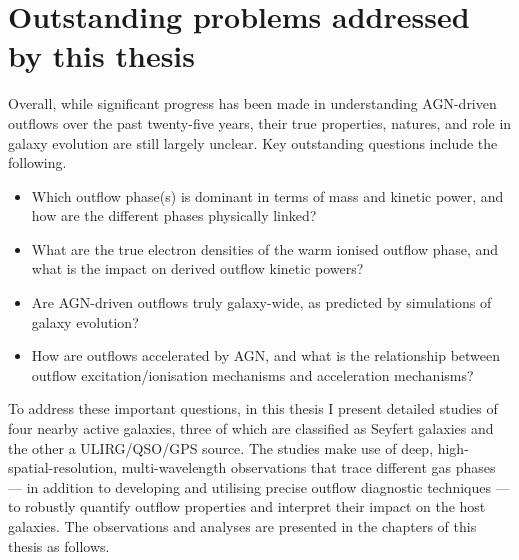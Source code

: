 \newpage

\section{Outstanding problems addressed by this thesis}
\label{section: introduction: outstanding problems}

Overall, while significant progress has been made in understanding AGN-driven outflows over the past twenty-five years, their true properties, natures, and role in galaxy evolution are still largely unclear. Key outstanding questions include the following. \\

\begin{itemize}
    \item Which outflow phase(s) is dominant in terms of mass and kinetic power, and how are the different phases physically linked?
    \item What are the true electron densities of the warm ionised outflow phase, and what is the impact on derived outflow kinetic powers?
    \item Are AGN-driven outflows truly galaxy-wide, as predicted by simulations of galaxy evolution?
    \item How are outflows accelerated by AGN, and what is the relationship between outflow excitation/ionisation mechanisms and acceleration mechanisms? \\
\end{itemize}

To address these important questions, in this thesis I present detailed studies of four nearby active galaxies, three of which are classified as Seyfert galaxies and the other a ULIRG/QSO/GPS source. The studies make use of deep, high-spatial-resolution, multi-wavelength observations that trace different gas phases --- in addition to developing and utilising precise outflow diagnostic techniques --- to robustly quantify outflow properties and interpret their impact on the host galaxies. The observations and analyses are presented in the chapters of this thesis as follows. \\

